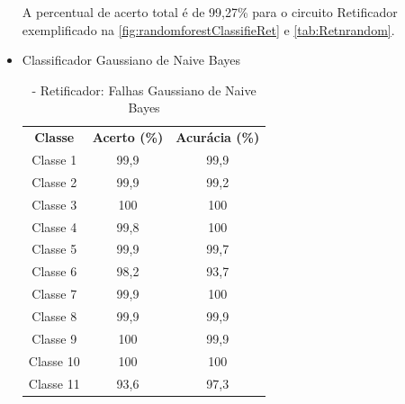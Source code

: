\begin{itemize}
A percentual de acerto total é de 99,27\% para o circuito Retificador exemplificado na \ref{fig:randomforestClassifieRet} e \ref{tab:Retnrandom}. 

\newpage
 \item Classificador Gaussiano de Naive Bayes
 
 \begin{table}[ht]
\centering
\begin{tabular}{ccc}
\textbf{Classe} & \textbf{Acerto (\%)} & \textbf{Acurácia (\%)} \\
Classe 1        & 99,9                  & 99,9                    \\
Classe 2        & 99,9                  & 99,2                    \\
Classe 3        & 100                  & 100                    \\
Classe 4        & 99,8                  & 100                    \\
Classe 5        & 99,9                  & 99,7                    \\
Classe 6        & 98,2                  & 93,7                    \\
Classe 7        & 99,9                  & 100                    \\
Classe 8        & 99,9                  & 99,9                    \\
Classe 9        & 100                  & 99,9                    \\
Classe 10       & 100                  & 100                    \\
Classe 11       & 93,6                  & 97,3                                 
\end{tabular}
\caption{\label{tab:RetnGND}- Retificador: Falhas Gaussiano de Naive Bayes}
\end{table}



\end{itemize}
